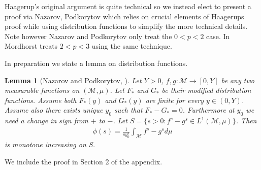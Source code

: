 \documentclass[10pt]{article}
\newcommand{\1}{\textbf{1}}
\newtheorem{lemma}[theorem]{Lemma}
\theoremstyle{remark}
\theoremstyle{definition}
\begin{document}
Haagerup's original argument is quite technical so we instead elect to present a proof via Nazarov, Podkorytov \cite{NP} which relies on crucial elements of Haagerups proof while using distribution functions to simplify the more technical details. Note however Nazarov and Podkorytov only treat the $0 < p <2$ case. In \cite{M} Mordhorst treats $2 < p < 3$ using the same technique.

In preparation we state a lemma on distribution functions.

\begin{lemma}[Nazarov and Podkorytov, \cite{NP}]
	Let $Y > 0$, $f,g : \mathcal{M} \to [0,Y]$ be any two measurable functions on $(\mathcal{M},\mu)$. Let $F_*$ and $G_*$ be their modified distribution functions. Assume both $F_*(y)$ and $G_*(y)$ are finite for every $y \in (0,Y)$. Assume also there exists unique $y_0$ such that $F_*-G_* = 0$. Furthermore at $y_0$ we need a change in sign from $+$ to $-$. Let $S = \{s > 0: f^s - g^s \in L^1(\mathcal{M},\mu)\}$. Then
	\begin{align*}
		\phi(s) = \frac{1}{sy_0^s}\int_{\mathcal{M}}f^s - g^s d\mu
	\end{align*}
	is monotone increasing on S. 
\end{lemma}

We include the proof in Section 2 of the appendix.

\end{document}

